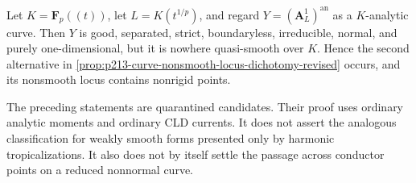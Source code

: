 \begin{example}
\label{ex:p213-nowhere-smooth-normal-curve-revised}
Let $K=\mathbf F_p((t))$, let $L=K(t^{1/p})$, and regard
$Y=(\mathbf A^1_L)^{\mathrm{an}}$ as a $K$-analytic curve.  Then $Y$ is
good, separated, strict, boundaryless, irreducible, normal, and purely
one-dimensional, but it is nowhere quasi-smooth over $K$.  Hence the
second alternative in
\cref{prop:p213-curve-nonsmooth-locus-dichotomy-revised} occurs, and its
nonsmooth locus contains nonrigid points.
\end{example}

\begin{remark}
\label{rem:p213-variation-graph-quarantine-scope-revised}
The preceding statements are quarantined candidates.  Their proof uses
ordinary analytic moments and ordinary CLD currents.  It does not assert
the analogous classification for weakly smooth forms presented only by
harmonic tropicalizations.  It also does not by itself settle the passage
across conductor points on a reduced nonnormal curve.
\end{remark}
